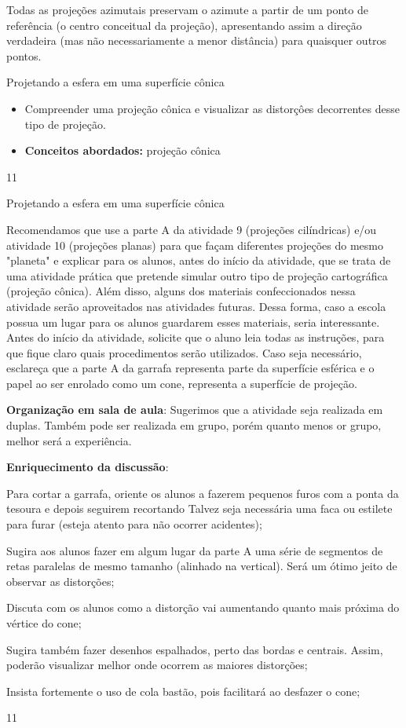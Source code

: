 Todas as projeções azimutais preservam o azimute a partir de um ponto de referência (o centro conceitual da projeção), apresentando assim a direção verdadeira (mas não necessariamente a menor distância) para quaisquer outros pontos. 

\cleardoublepage
\def\currentcolor{session1}
\begin{ObjetivoEsp}{Projetando a esfera em uma superfície cônica}
{ \begin{itemize}
  \item Compreender uma projeção cônica e visualizar as distorçôes decorrentes desse tipo de projeção.
  \item \textbf{Conceitos abordados:} projeção cônica
  \end{itemize}
}{1}{1}
\end{ObjetivoEsp}
\begin{Recomenda}{Projetando a esfera em uma superfície cônica}
{
  Recomendamos que use a parte A da atividade 9 (projeções cilíndricas) e/ou atividade 10 (projeções planas) para que façam diferentes projeções do mesmo "planeta" e explicar para os alunos, antes do início da atividade, que se trata de uma atividade prática que pretende simular outro tipo de projeção cartográfica (projeção cônica). Além disso, alguns dos materiais confeccionados nessa atividade serão aproveitados nas atividades futuras. Dessa forma, caso a escola possua um lugar para os alunos guardarem esses materiais, seria interessante. Antes do início da atividade, solicite que o aluno leia todas as instruções, para que fique claro quais procedimentos serão utilizados. Caso seja necessário, esclareça que a parte A da garrafa representa parte da superfície esférica e o papel ao ser enrolado como um cone, representa a superfície de projeção.

  \textbf{Organização em sala de aula}: Sugerimos que a atividade seja realizada em duplas. Também pode ser realizada em grupo, porém quanto menos or grupo, melhor será a experiência.

  \textbf{Enriquecimento da discussão}:
  
  Para cortar a garrafa, oriente os alunos a fazerem pequenos furos com a ponta da tesoura e depois seguirem recortando Talvez seja necessária uma faca ou estilete para furar (esteja atento para não ocorrer acidentes);

  Sugira aos alunos fazer em algum lugar da parte A uma série de segmentos de retas paralelas de mesmo tamanho (alinhado na vertical). Será um ótimo jeito de observar as distorções;

  Discuta com os alunos como a distorção vai aumentando quanto mais próxima do vértice do cone;

  Sugira também fazer desenhos espalhados, perto das bordas e centrais. Assim, poderão visualizar melhor onde ocorrem as maiores distorções;

  Insista fortemente o uso de cola bastão, pois facilitará ao desfazer o cone;
}{1}{1}
\end{Recomenda}

